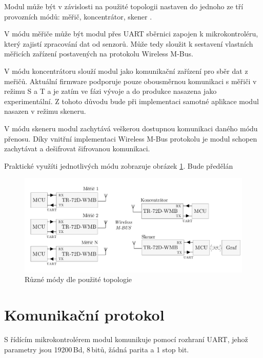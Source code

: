 Modul může být v závislosti na použité topologii nastaven do jednoho ze tří provozních módů: měřič, koncentrátor, skener \cite{iqrfmodul}. 

V módu měřiče může být modul přes UART sběrnici zapojen k mikrokontroléru, který zajistí zpracování dat od senzorů. Může tedy sloužit k sestavení vlastních měřicích zařízení postavených na protokolu Wireless M-Bus.

V módu koncentrátoru slouží modul jako komunikační zařízení pro sběr dat z meřičů. Aktuální firmware podporuje pouze obousměrnou komunikaci s měřiči v režimu S a T a je zatím ve fázi vývoje a do produkce nasazena jako experimentální. Z tohoto důvodu bude při implementaci samotné aplikace modul nasazen v režimu skeneru.

V módu skeneru modul zachytává veškerou dostupnou komunikaci daného módu přenosu. Díky vnitřní implementaci Wireless M-Bus protokolu je modul schopen zachytávat a dešifrovat šifrovanou komunikaci.

Praktické využíti jednotlivých módu zobrazuje obrázek \ref{TopologieIQRF}. \colorbox[rgb]{0,1,0}{Bude předělán}

 \begin{figure}[!h]
  \begin{center}
    \includegraphics[scale=0.6]{obrazky/modul_topologie}
  \end{center}
  \caption{Různé módy dle použité topologie \cite{iqrfmodul}}
	\label{TopologieIQRF}
\end{figure}

\section{Komunikační protokol}

S řídícím mikrokontrolérem modul komunikuje pomocí rozhraní UART, jehož parametry jsou 19200\,Bd, 8\,bitů, žádná parita a 1 stop bit.
		
